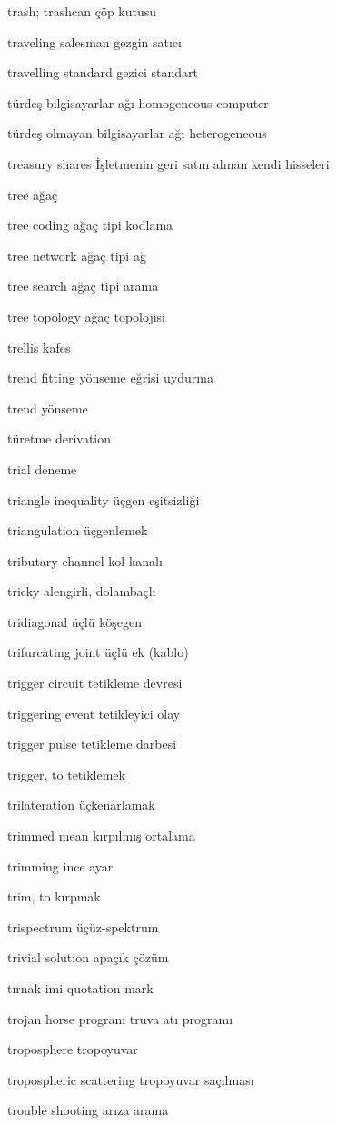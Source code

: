\documentclass[12pt,fleqn]{article}\usepackage{../../common}
\begin{document}
trash; trashcan çöp kutusu

traveling salesman gezgin satıcı

travelling standard gezici standart

türdeş bilgisayarlar ağı homogeneous computer

türdeş olmayan bilgisayarlar ağı heterogeneous

treasury shares İşletmenin geri satın alınan kendi hisseleri

tree ağaç

tree coding ağaç tipi kodlama

tree network ağaç tipi ağ

tree search ağaç tipi arama

tree topology ağaç topolojisi

trellis kafes

trend fitting yönseme eğrisi uydurma

trend yönseme

türetme derivation

trial deneme

triangle inequality üçgen eşitsizliği

triangulation üçgenlemek

tributary channel kol kanalı

tricky alengirli, dolambaçlı

tridiagonal üçlü köşegen

trifurcating joint üçlü ek (kablo)

trigger circuit tetikleme devresi

triggering event tetikleyici olay

trigger pulse tetikleme darbesi

trigger, to tetiklemek

trilateration üçkenarlamak

trimmed mean kırpılmış ortalama

trimming ince ayar

trim, to kırpmak

trispectrum üçüz-spektrum

trivial solution apaçık çözüm

tırnak imi quotation mark

trojan horse program truva atı programı

troposphere tropoyuvar

tropospheric scattering tropoyuvar saçılması

trouble shooting arıza arama
\end{document}
